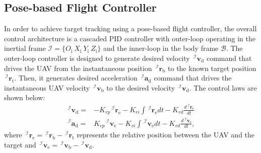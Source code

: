 \documentclass[lettersize,journal]{IEEEtran}
\begin{document}
\subsection{Pose-based Flight Controller}
In order to achieve target tracking using a pose-based flight controller, the overall control architecture is a cascaded PID controller with outer-loop operating in the inertial frame $\mathcal{I}=\{O_{\text{i}} ~X_{\text{i}} ~Y_{\text{i}} ~Z_{\text{i}}\}$ and the inner-loop in the body frame $\mathcal{B}$.
The outer-loop controller is designed to generate desired velocity $\,^\mathcal{I}\boldsymbol{v}_{\text{d}}$ command that drives the UAV from the instantaneous position $\,^\mathcal{I} \boldsymbol{r}_{\text{b}}$ to the known target position $\,^\mathcal{I}\boldsymbol{r}_{\text{t}}$.
Then, it generates desired acceleration $\,^\mathcal{I}\boldsymbol{a}_{\text{d}}$ command that drives the instantaneous UAV velocity $\,^\mathcal{I} \boldsymbol{v}_{\text{b}}$ to the desired velocity $\,^\mathcal{I}\boldsymbol{v}_{\text{d}}$.
The control laws are shown below:
\begin{align} \label{outer_loop_control: equation}
    \,^\mathcal{I}\boldsymbol{v}_{\text{d}} =& - K_{rp} \,^\mathcal{I}\boldsymbol{r}_{\text{e}} - K_{ri} \int \,^\mathcal{I}\boldsymbol{r}_{\text{e}} dt - K_{rd} \frac{d\,^\mathcal{I}\boldsymbol{r}_{\text{e}}}{dt} \nonumber \\
    \,^\mathcal{I}\boldsymbol{a}_{\text{d}} =&  K_{vp} \,^\mathcal{I}\boldsymbol{v}_{\text{e}} - K_{vi} \int \,^\mathcal{I}\boldsymbol{v}_{\text{e}} dt - K_{vd} \frac{d\,^\mathcal{I}\boldsymbol{v}_{\text{e}}}{dt},
\end{align}
where $\,^\mathcal{I}\boldsymbol{r}_{\text{e}} = \,^\mathcal{I}\boldsymbol{r}_{\text{b}} - \,^\mathcal{I}\boldsymbol{r}_{\text{t}}$ represents the relative position between the UAV and the target and $\,^\mathcal{I}\boldsymbol{v}_{\text{e}} = \,^\mathcal{I}\boldsymbol{v}_{\text{b}} - \,^\mathcal{I}\boldsymbol{v}_{\text{d}}$.
\end{document}
